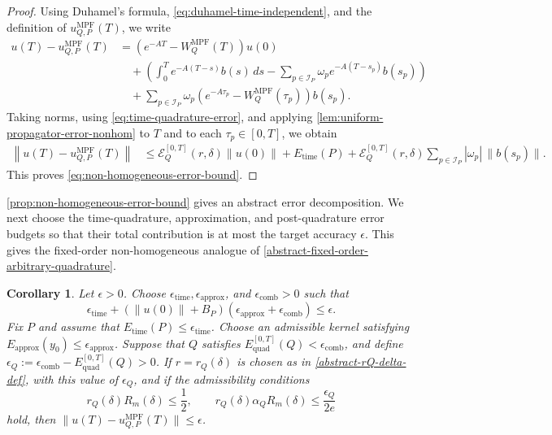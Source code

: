 \documentclass[10pt,reqno]{article}
\numberwithin{equation}{section}
\theoremstyle{plain}
\newtheorem{cor}[thm]{Corollary}
\theoremstyle{definition}
\begin{document}
\begin{proof}
Using Duhamel's formula, \cref{eq:duhamel-time-independent}, and the definition of \(u_{Q,P}^{\operatorname{MPF}}(T)\), we write
\begin{align}
u(T)-u_{Q,P}^{\operatorname{MPF}}(T) &= \left(e^{-AT}-W_Q^{\operatorname{MPF}}(T)\right)u(0) \\ &\quad+\left(\int_0^T e^{-A(T-s)}b(s)\,ds-\sum_{p\in\mathcal I_P}\omega_p e^{-A(T-s_p)}b(s_p)\right) \\ &\quad+\sum_{p\in\mathcal I_P}\omega_p\left(e^{-A\tau_p}-W_Q^{\operatorname{MPF}}(\tau_p)\right)b(s_p).
\end{align}
Taking norms, using \cref{eq:time-quadrature-error}, and applying \cref{lem:uniform-propagator-error-nonhom} to \(T\) and to each \(\tau_p\in[0,T]\), we obtain
\begin{align}
\left\|u(T)-u_{Q,P}^{\operatorname{MPF}}(T)\right\| &\leq \mathcal E_Q^{[0,T]}(r,\delta)\|u(0)\|+E_{\operatorname{time}}(P)+\mathcal E_Q^{[0,T]}(r,\delta)\sum_{p\in\mathcal I_P}|\omega_p|\,\|b(s_p)\|.
\end{align}
This proves \cref{eq:non-homogeneous-error-bound}.
\end{proof}

\cref{prop:non-homogeneous-error-bound} gives an abstract error decomposition. We next choose the time-quadrature, approximation, and post-quadrature error budgets so that their total contribution is at most the target accuracy \(\epsilon\). This gives the fixed-order non-homogeneous analogue of \cref{abstract-fixed-order-arbitrary-quadrature}.

\begin{cor}\label{cor:non-homogeneous-fixed-order}
Let \(\epsilon>0\). Choose \(\epsilon_{\operatorname{time}},\epsilon_{\operatorname{approx}}\), and \(\epsilon_{\operatorname{comb}}>0\) such that
\begin{equation}\label{eq:non-homogeneous-budget}
\epsilon_{\operatorname{time}}+\left(\|u(0)\|+B_P\right)\left(\epsilon_{\operatorname{approx}}+\epsilon_{\operatorname{comb}}\right)\leq \epsilon.
\end{equation}
Fix \(P\) and assume that \(E_{\operatorname{time}}(P)\leq \epsilon_{\operatorname{time}}\). Choose an admissible kernel satisfying \(E_{\operatorname{approx}}(y_0)\leq\epsilon_{\operatorname{approx}}\). Suppose that \(Q\) satisfies \(E_{\operatorname{quad}}^{[0,T]}(Q)<\epsilon_{\operatorname{comb}}\), and define \(\epsilon_Q:=\epsilon_{\operatorname{comb}}-E_{\operatorname{quad}}^{[0,T]}(Q)>0\). If \(r=r_Q(\delta)\) is chosen as in \cref{abstract-rQ-delta-def}, with this value of \(\epsilon_Q\), and if the admissibility conditions
\begin{equation}\label{eq:nonhom-admissibility-conditions}
r_Q(\delta)R_m(\delta)\leq\frac12, \qquad r_Q(\delta)\alpha_QR_m(\delta)\leq\frac{\epsilon_Q}{2e}
\end{equation}
hold, then \(\|u(T)-u_{Q,P}^{\operatorname{MPF}}(T)\|\leq\epsilon\).
\end{cor}
\end{document}
